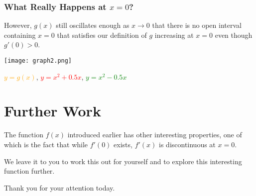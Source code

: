 \documentclass{beamer} %
\theoremstyle{definition} %
\begin{document}
\begin{frame}
\frametitle{What Really Happens at $x=0$?}
However, $g(x)$ still oscillates enough as $x\to 0$ that there is no open interval containing $x=0$ that satisfies our definition of $g$ increasing at $x=0$ even though $g'(0)>0$.\pause

\begin{center}
\texttt{[image: graph2.png]}

\textcolor{orange}{$y=g(x)$}, \textcolor{red}{$y=x^2+0.5x$}, \textcolor{green}{$y=x^2-0.5x$} 
\end{center}

\end{frame}

\section{Further Work} %

\begin{frame}
The function $f(x)$ introduced earlier has other interesting properties, one of which is the fact that while $f'(0)$ exists, $f'(x)$ is discontinuous at $x=0$.\vspace{.5cm}

We leave it to you to work this out for yourself and to explore this interesting function further.\vspace{.5cm}

Thank you for your attention today.
\end{frame}

\end{document}
